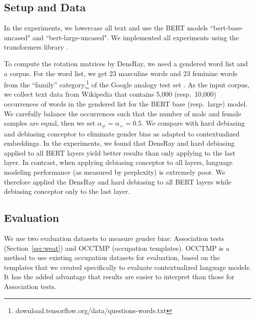 \subsection{Setup and Data}
In the experiments, we lowercase all text and use the BERT models ``bert-base-uncased" and ``bert-large-uncased". We implemented all experiments using the transformers library \cite{wolf2019huggingfaces}.

To compute the rotation matrices by DensRay, we need a gendered word list and a corpus. For the word list, we get 23 masculine words and 23 feminine words from
the ``family'' category,\footnote{download.tensorflow.org/data/questions-words.txt}
of the Google analogy test set \cite{mikolov2013efficient}. As the input corpus, we collect text data from Wikipedia that contains 5,000 (resp.\ 10,000)
occurrences of words in the gendered list for the BERT base
(resp.\ large) model. We carefully balance the occurrences such that the number of male and female samples are equal, then we set  $\alpha_{\neq}=\alpha_{=}=0.5$. We compare with hard debiasing \cite{mu2018all} and debiasing conceptor \cite{karve2019conceptor} to eliminate gender bias as adapted to contextualized embeddings. In the experiments, we found that DensRay and hard debiasing applied to all BERT layers yield better results than only applying to the last layer. In contrast, when applying debiasing conceptor to all layers, language modeling performance (as measured by perplexity) is extremely poor.
We therefore applied the DensRay and hard debiasing to all BERT layers while debiasing conceptor only to the last layer.

\subsection{Evaluation}
We use two evaluation datasets to measure gender bias: Association tests (Section~\ref{sec:weat}) and OCCTMP (occupation templates). OCCTMP is a method to use existing occupation datasets for evaluation, based on the templates that we created specifically to evaluate contextualized language models.  It has the added advantage that results are easier to interpret than those for Association tests.

